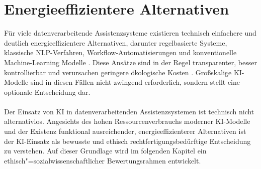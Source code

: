 \section{Energieeffizientere Alternativen}
Für viele datenverarbeitende Assistenzsysteme existieren technisch einfachere und deutlich energieeffizientere Alternativen, darunter regelbasierte Systeme, klassische NLP-Verfahren, Workflow-Automatisierungen und konventionelle Machine-Learning Modelle \cite{zschacheComparingEnergyConsumption2025}. Diese Ansätze sind in der Regel transparenter, besser kontrollierbar und verursachen geringere ökologische Kosten \cite{ventersSustainableSoftwareEngineering2023}. Großskalige KI-Modelle sind in diesen Fällen nicht zwingend erforderlich, sondern stellt eine optionale Entscheidung dar.

\paragraph{}

Der Einsatz von KI in datenverarbeitenden Assistenzsystemen ist technisch nicht alternativlos. Angesichts des hohen Ressourcenverbrauchs moderner KI-Modelle und der Existenz funktional ausreichender, energieeffizienterer Alternativen ist der KI-Einsatz als bewusste und ethisch rechtfertigungsbedürftige Entscheidung zu verstehen. Auf dieser Grundlage wird im folgenden Kapitel ein ethisch"=sozialwissenschaftlicher Bewertungsrahmen entwickelt.